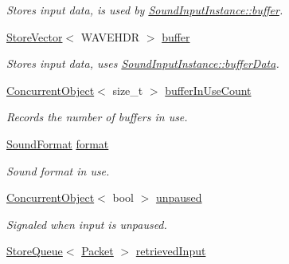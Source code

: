 \begin{DoxyCompactItemize}
\begin{DoxyCompactList}\small\item\em Stores input data, is used by \hyperlink{class_sound_input_instance_ab77e1132d51ce6cd63488d598163903f}{SoundInputInstance::buffer}. \item\end{DoxyCompactList}\item 
\hypertarget{class_sound_input_instance_ab77e1132d51ce6cd63488d598163903f}{
\hyperlink{class_store_vector}{StoreVector}$<$ WAVEHDR $>$ \hyperlink{class_sound_input_instance_ab77e1132d51ce6cd63488d598163903f}{buffer}}
\label{class_sound_input_instance_ab77e1132d51ce6cd63488d598163903f}

\begin{DoxyCompactList}\small\item\em Stores input data, uses \hyperlink{class_sound_input_instance_a5023ac6f56ffeb181261661741be991b}{SoundInputInstance::bufferData}. \item\end{DoxyCompactList}\item 
\hyperlink{class_concurrent_object}{ConcurrentObject}$<$ size\_\-t $>$ \hyperlink{class_sound_input_instance_a16147bab868c96e02f20943a300b3428}{bufferInUseCount}
\begin{DoxyCompactList}\small\item\em Records the number of buffers in use. \item\end{DoxyCompactList}\item 
\hypertarget{class_sound_input_instance_a10c705a8d08cc30306efe5c9ff45e567}{
\hyperlink{class_sound_format}{SoundFormat} \hyperlink{class_sound_input_instance_a10c705a8d08cc30306efe5c9ff45e567}{format}}
\label{class_sound_input_instance_a10c705a8d08cc30306efe5c9ff45e567}

\begin{DoxyCompactList}\small\item\em Sound format in use. \item\end{DoxyCompactList}\item 
\hypertarget{class_sound_input_instance_a17c7036ec3416f3abde5d8a70dfcfdd4}{
\hyperlink{class_concurrent_object}{ConcurrentObject}$<$ bool $>$ \hyperlink{class_sound_input_instance_a17c7036ec3416f3abde5d8a70dfcfdd4}{unpaused}}
\label{class_sound_input_instance_a17c7036ec3416f3abde5d8a70dfcfdd4}

\begin{DoxyCompactList}\small\item\em Signaled when input is unpaused. \item\end{DoxyCompactList}\item 
\hypertarget{class_sound_input_instance_aeddbeeb79805cb7e58624774eff61efc}{
\hyperlink{class_store_queue}{StoreQueue}$<$ \hyperlink{class_packet}{Packet} $>$ \hyperlink{class_sound_input_instance_aeddbeeb79805cb7e58624774eff61efc}{retrievedInput}}
\label{class_sound_input_instance_aeddbeeb79805cb7e58624774eff61efc}


\end{DoxyCompactItemize}
